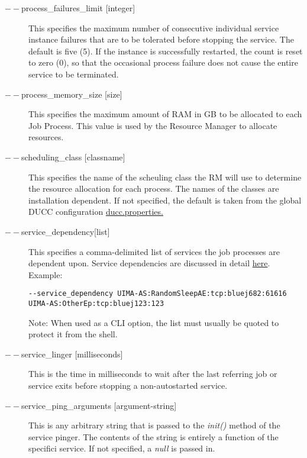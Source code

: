 \begin{description}
      \item[$--$process\_failures\_limit {[integer]}] 
        This specifies the maximum number of consecutive individual service instance failures that are to be 
        tolerated before stopping the service. The default is five (5). If the instance is successfully
        restarted, the count is reset to zero (0), so that the occasional process failure does not cause
        the entire service to be terminated.
        
      \item[$--$process\_memory\_size {[size]}] This specifies the maximum amount of RAM in GB to be
        allocated to each Job Process.  This value is used by the Resource Manager to allocate
        resources. 

      \item[$--$scheduling\_class {[classname]}] This specifies the name of the scheuling class the RM
        will use to determine the resource allocation for each process. The names of the classes are
        installation dependent. If not specified, the default is taken from the global DUCC
        configuration \hyperref[sec:ducc.properties]{ducc.properties.}

      \item[$--$service\_dependency{[list]}] This specifies a comma-delimited list of services the job
        processes are dependent upon. Service dependencies are discussed in detail
        \hyperref[sec:service.endpoints]{here}. Example:
\begin{verbatim}
--service_dependency UIMA-AS:RandomSleepAE:tcp:bluej682:61616 UIMA-AS:OtherEp:tcp:bluej123:123 
\end{verbatim}

        Note: When used as a CLI option, the list must usually be
        quoted to protect it from the shell.
          

      \item[$--$service\_linger {[milliseconds]}] This is the time in milliseconds to wait after the last
        referring job or service exits before stopping a non-autostarted service.

      \item[$--$service\_ping\_arguments {[argument-string]}] This is any arbitrary string
        that is passed to the {\em init()} method of the service pinger.  The contents of
        the string is entirely a function of the specifici service.  If not specified,
        a {\em null} is passed in.


\end{description}
